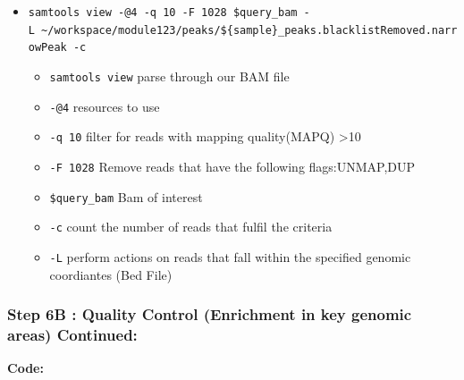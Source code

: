 \documentclass[
]{book}
\providecommand{\tightlist}{%
  \setlength{\itemsep}{0pt}\setlength{\parskip}{0pt}}
\begin{document}
\begin{itemize}
\tightlist
\item
  \texttt{samtools\ view\ -@4\ -q\ 10\ -F\ 1028\ \$query\_bam\ -L\ \textasciitilde{}/workspace/module123/peaks/\$\{sample\}\_peaks.blacklistRemoved.narrowPeak\ -c}

  \begin{itemize}
  \tightlist
  \item
    \texttt{samtools\ view} parse through our BAM file
  \item
    \texttt{-@4} resources to use
  \item
    \texttt{-q\ 10} filter for reads with mapping quality(MAPQ) \textgreater10
  \item
    \texttt{-F\ 1028} Remove reads that have the following flags:UNMAP,DUP
  \item
    \texttt{\$query\_bam} Bam of interest
  \item
    \texttt{-c} count the number of reads that fulfil the criteria
  \item
    \texttt{-L} perform actions on reads that fall within the specified genomic coordiantes (Bed File)
  \end{itemize}
\end{itemize}

\subsubsection{Step 6B : Quality Control (Enrichment in key genomic areas) Continued:}\label{step-6b-quality-control-enrichment-in-key-genomic-areas-continued}

\textbf{Code:}
\end{document}

